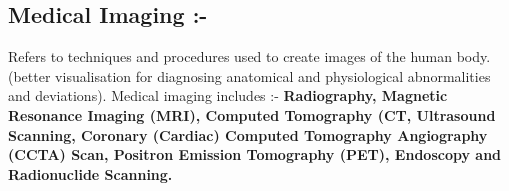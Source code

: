 \documentclass[12pt]{article}
\begin{document}
\begin{small}
\section{Medical Imaging :-}
Refers to  techniques and procedures used to create images of the human body.(better visualisation for diagnosing anatomical and physiological abnormalities and deviations). Medical imaging includes :-
\textbf{Radiography, Magnetic Resonance Imaging (MRI), Computed Tomography (CT, Ultrasound Scanning, Coronary (Cardiac) Computed Tomography Angiography (CCTA) Scan, Positron Emission Tomography (PET), Endoscopy and Radionuclide Scanning.}







\end{small}
\end{document}
